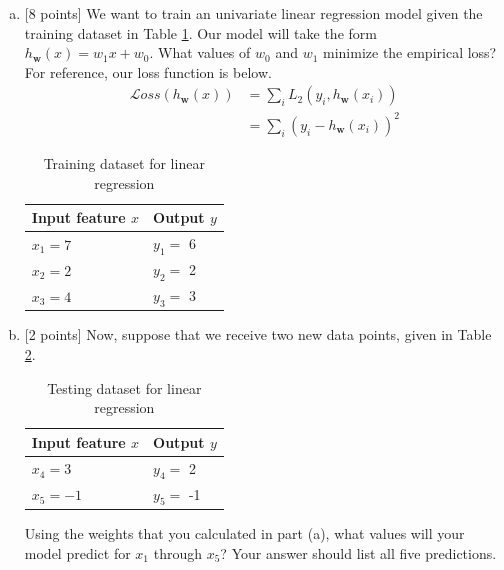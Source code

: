 \documentclass{homework}
\begin{document}
\begin{enumerate}[(a)]

    \item {[8 points]} We want to train an univariate linear regression model given the training dataset in Table \ref{table:lr_test_data}. Our model will take the form $h_{\mathbf{w}}(x) = w_1x+w_0$. What values of $w_0$ and $w_1$ minimize the empirical loss? For reference, our loss function is below.  
    \begin{align*}
        \mathcal{L}oss(h_{\mathbf{w}}(x)) &= \sum_iL_2(y_i,h_{\mathbf{w}}(x_i)) \\
                                       &= \sum_i(y_i - h_{\mathbf{w}}(x_i))^2
    \end{align*}
    

    \begin{table}[th]
    \centering
    \begin{tabular}{|l|l|}
    \hline
    Input feature $x$ & Output $y$\\
    \hline
    $x_{1} = 7$ & $y_{1}=$ 6 \\
    \hline
    $x_{2} = 2$ & $y_{2}=$ 2 \\
    \hline
    $x_{3} = 4$ & $y_{3}=$ 3 \\
    \hline
    \end{tabular}
    \caption{Training dataset for linear regression}
    \label{table:lr_test_data}
    \end{table}

    \vspace{300px}

    \item {[2 points]} Now, suppose that we receive two new data points, given in Table \ref{table:lr_new_data}. 
    \begin{table}[th]
    \centering
    \begin{tabular}{|l|l|}
    \hline
    Input feature $x$ & Output $y$\\
    \hline
    $x_{4}=3$ & $y_{4}=$ 2 \\
    \hline
    $x_{5}=-1$ & $y_{5}=$ -1 \\
    \hline
    \end{tabular}
    \caption{Testing dataset for linear regression}
    \label{table:lr_new_data}
    \end{table}
    
    Using the weights that you calculated in part (a), what values will your model predict for $x_1$ through $x_5$? Your answer should list all five predictions.


\end{enumerate}
\end{document}
